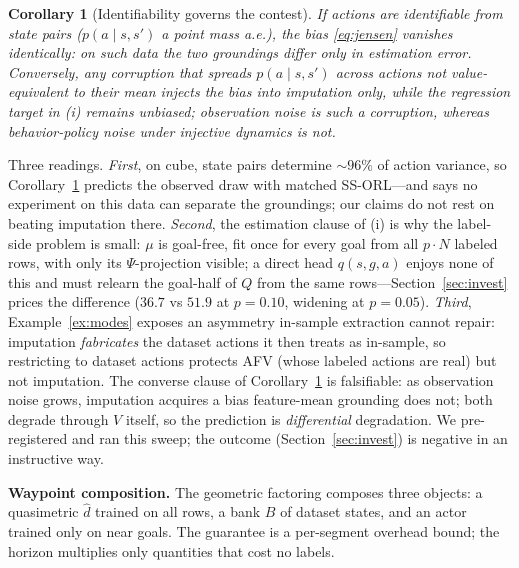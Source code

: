 \documentclass{article}
\theoremstyle{plain}
\newtheorem{corollary}{Corollary}
\theoremstyle{definition}
\begin{document}
\begin{corollary}[Identifiability governs the contest]
\label{cor:ident}
If actions are identifiable from state pairs ($p(a\mid s,s')$ a point mass a.e.), the bias \eqref{eq:jensen} vanishes identically: on such data the two groundings differ only in estimation error. Conversely, any corruption that spreads $p(a\mid s,s')$ across actions not value-equivalent to their mean injects the bias into imputation only, while the regression target in (i) remains unbiased; observation noise is such a corruption, whereas behavior-policy noise under injective dynamics is not.
\end{corollary}

Three readings. \emph{First}, on cube, state pairs determine ${\sim}96\%$ of action variance, so Corollary~\ref{cor:ident} predicts the observed draw with matched SS-ORL---and says no experiment on this data can separate the groundings; our claims do not rest on beating imputation there. \emph{Second}, the estimation clause of (i) is why the label-side problem is small: $\mu$ is goal-free, fit once for every goal from all $p\!\cdot\!N$ labeled rows, with only its $\Psi$-projection visible; a direct head $q(s,g,a)$ enjoys none of this and must relearn the goal-half of $Q$ from the same rows---Section~\ref{sec:invest} prices the difference ($36.7$ vs $51.9$ at $p{=}0.10$, widening at $p{=}0.05$). \emph{Third}, Example~\ref{ex:modes} exposes an asymmetry in-sample extraction cannot repair: imputation \emph{fabricates} the dataset actions it then treats as in-sample, so restricting to dataset actions protects AFV (whose labeled actions are real) but not imputation. The converse clause of Corollary~\ref{cor:ident} is falsifiable: as observation noise grows, imputation acquires a bias feature-mean grounding does not; both degrade through $V$ itself, so the prediction is \emph{differential} degradation. We pre-registered and ran this sweep; the outcome (Section~\ref{sec:invest}) is negative in an instructive way.

\textbf{Waypoint composition.} The geometric factoring composes three objects: a quasimetric $\hat d$ trained on all rows, a bank $B$ of dataset states, and an actor trained only on near goals. The guarantee is a per-segment overhead bound; the horizon multiplies only quantities that cost no labels.
\end{document}
